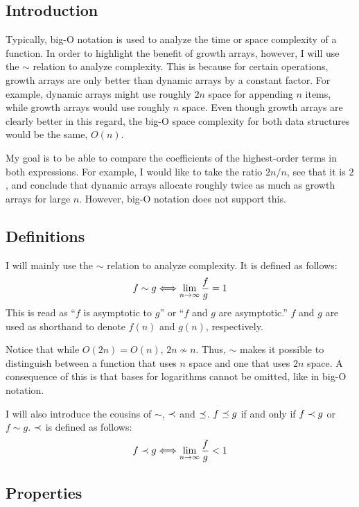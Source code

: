 \subsection{Introduction}

Typically, big-O notation is used to analyze the time or space complexity of a function. In order to highlight the benefit of growth arrays, however, I will use the $\sim$ relation to analyze complexity. This is because for certain operations, growth arrays are only better than dynamic arrays by a constant factor. For example, dynamic arrays might use roughly $2n$ space for appending $n$ items, while growth arrays would use roughly $n$ space. Even though growth arrays are clearly better in this regard, the big-O space complexity for both data structures would be the same, $O(n)$.

My goal is to be able to compare the coefficients of the highest-order terms in both expressions. For example, I would like to take the ratio $2n / n$, see that it is $2$, and conclude that dynamic arrays allocate roughly twice as much as growth arrays for large $n$. However, big-O notation does not support this.

\subsection{Definitions}

I will mainly use the $\sim$ relation to analyze complexity. It is defined as follows:
\begin{align*}
f \sim g \Longleftrightarrow \lim_{n \to \infty} \frac f g = 1
\end{align*}
This is read as ``$f$ is asymptotic to $g$'' or ``$f$ and $g$ are asymptotic.'' {\HdrNote} $f$ and $g$ are used as shorthand to denote $f(n)$ and $g(n)$, respectively.

Notice that while $O(2n) = O(n)$, $2n \not\sim n$. Thus, $\sim$ makes it possible to distinguish between a function that uses $n$ space and one that uses $2n$ space. {\HdrNote} A consequence of this is that bases for logarithms cannot be omitted, like in big-O notation.

I will also introduce the cousins of $\sim$, $\prec$ and $\preceq$. $f \preceq g$ if and only if $f \prec g$ or $f \sim g$. $\prec$ is defined as follows:
\begin{align*}
f \prec g \Longleftrightarrow \lim_{n \to \infty} \frac f g < 1
\end{align*}
\subsection{Properties}
\label{subsec:AsymptoticProperties}

